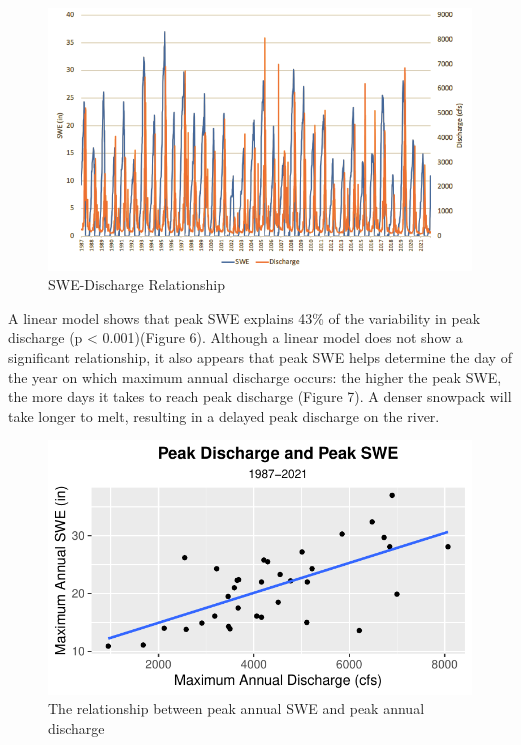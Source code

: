 \documentclass[
  12pt,
]{article}
\begin{document}
\begin{figure}
\centering
\includegraphics{snowpack_discharge_plot.png}
\caption{SWE-Discharge Relationship}
\end{figure}

A linear model shows that peak SWE explains 43\% of the variability in
peak discharge (p \textless{} 0.001)(Figure 6). Although a linear model
does not show a significant relationship, it also appears that peak SWE
helps determine the day of the year on which maximum annual discharge
occurs: the higher the peak SWE, the more days it takes to reach peak
discharge (Figure 7). A denser snowpack will take longer to melt,
resulting in a delayed peak discharge on the river.

\begin{figure}
\centering
\includegraphics{Final_Report_files/figure-latex/unnamed-chunk-5-1.pdf}
\caption{The relationship between peak annual SWE and peak annual
discharge}
\end{figure}
\end{document}
